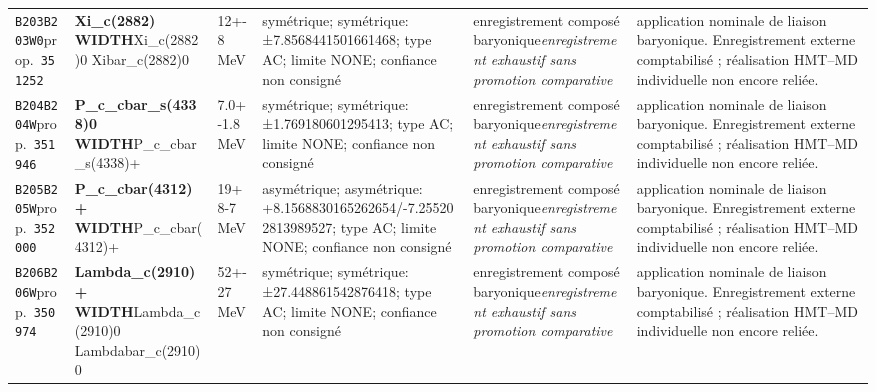 \begin{landscape}
\begin{longtable}{L{1.85cm}L{4.45cm}L{2.35cm}L{4.05cm}L{3.35cm}L{7.15cm}}
\texttt{B203}\newline \texttt{B203W0}\newline prop.\ \texttt{351252} & \textbf{Xi\_\allowbreak{}c(2882) WIDTH}\newline Xi\_\allowbreak{}c(2882)0 \textbar{}\allowbreak{} Xibar\_\allowbreak{}c(2882)0 & 12+-8\,MeV & symétrique; symétrique: ±7.8568441501661468; type AC; limite NONE; confiance non consigné & enregistrement composé baryonique\newline \emph{enregistrement exhaustif sans promotion comparative} & application nominale de liaison baryonique. Enregistrement externe comptabilisé ; réalisation HMT--MD individuelle non encore reliée. \\
\texttt{B204}\newline \texttt{B204W}\newline prop.\ \texttt{351946} & \textbf{P\_\allowbreak{}c\_\allowbreak{}cbar\_\allowbreak{}s(4338)0 WIDTH}\newline P\_\allowbreak{}c\_\allowbreak{}cbar\_\allowbreak{}s(4338)+ & 7.0+-1.8\,MeV & symétrique; symétrique: ±1.769180601295413; type AC; limite NONE; confiance non consigné & enregistrement composé baryonique\newline \emph{enregistrement exhaustif sans promotion comparative} & application nominale de liaison baryonique. Enregistrement externe comptabilisé ; réalisation HMT--MD individuelle non encore reliée. \\
\texttt{B205}\newline \texttt{B205W}\newline prop.\ \texttt{352000} & \textbf{P\_\allowbreak{}c\_\allowbreak{}cbar(4312)+ WIDTH}\newline P\_\allowbreak{}c\_\allowbreak{}cbar(4312)+ & 19+8-7\,MeV & asymétrique; asymétrique: +8.1568830165262654/-7.255202813989527; type AC; limite NONE; confiance non consigné & enregistrement composé baryonique\newline \emph{enregistrement exhaustif sans promotion comparative} & application nominale de liaison baryonique. Enregistrement externe comptabilisé ; réalisation HMT--MD individuelle non encore reliée. \\
\texttt{B206}\newline \texttt{B206W}\newline prop.\ \texttt{350974} & \textbf{Lambda\_\allowbreak{}c(2910)+ WIDTH}\newline Lambda\_\allowbreak{}c(2910)0 \textbar{}\allowbreak{} Lambdabar\_\allowbreak{}c(2910)0 & 52+-27\,MeV & symétrique; symétrique: ±27.448861542876418; type AC; limite NONE; confiance non consigné & enregistrement composé baryonique\newline \emph{enregistrement exhaustif sans promotion comparative} & application nominale de liaison baryonique. Enregistrement externe comptabilisé ; réalisation HMT--MD individuelle non encore reliée. \\

\end{longtable}
\end{landscape}
